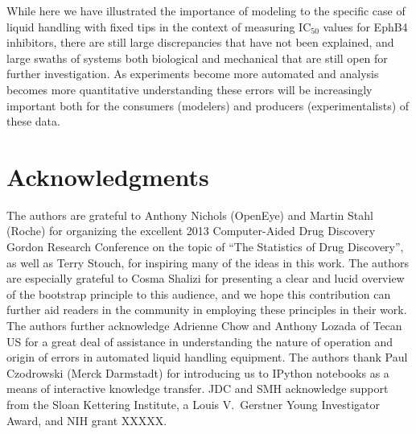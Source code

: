 \documentclass[aps,pre,twocolumn,nofootinbib,superscriptaddress,linenumbers]{revtex4-1}
\begin{document}
While here we have illustrated the importance of modeling to the specific case of liquid handling with fixed tips in the context of measuring IC$_{50}$ values for EphB4 inhibitors, there are still large discrepancies that have not been explained, and large swaths of systems both biological and mechanical that are still open for further investigation. 
As experiments become more automated and analysis becomes more quantitative understanding these errors will be increasingly important both for the consumers (modelers) and producers (experimentalists) of these data.


\section{Acknowledgments}
\label{section:acknowledgments}

The authors are grateful to Anthony Nichols (OpenEye) and Martin Stahl (Roche) for organizing the excellent 2013 Computer-Aided Drug Discovery Gordon Research Conference on the topic of ``The Statistics of Drug Discovery'', as well as Terry Stouch, for inspiring many of the ideas in this work.
The authors are especially grateful to Cosma Shalizi for presenting a clear and lucid overview of the bootstrap principle to this audience, and we hope this contribution can further aid readers in the community in employing these principles in their work.
The authors further acknowledge Adrienne Chow and Anthony Lozada of Tecan US for a great deal of assistance in understanding the nature of operation and origin of errors in automated liquid handling equipment.
The authors thank Paul Czodrowski (Merck Darmstadt) for introducing us to IPython notebooks as a means of interactive knowledge transfer.
JDC and SMH acknowledge support from the Sloan Kettering Institute, a Louis V.~Gerstner Young Investigator Award, and NIH grant {\color{red}XXXXX}.



 

\end{document}
